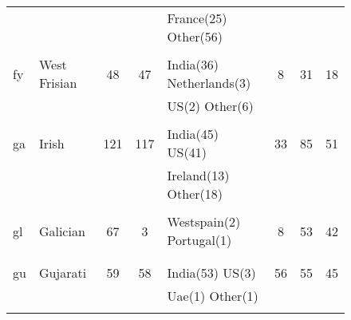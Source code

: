 \begin{figure}[h]
\begin{tabular}{llcclccc}
&&&&France(25) Other(56) &&&\\
&&&&&&&\\
fy&West Frisian&48&47&India(36) Netherlands(3) &8&31&18\\
&&&&US(2) Other(6) &&&\\
&&&&&&&\\
ga&Irish&121&117&India(45) US(41) &33&85&51\\
&&&&Ireland(13) Other(18) &&&\\
&&&&&&&\\
gl&Galician&67&3&Westspain(2) Portugal(1) &8&53&42\\
&&&&&&&\\
&&&&&&&\\
gu&Gujarati&59&58&India(53) US(3) &56&55&45\\
&&&&Uae(1) Other(1) &&&\\
&&&&&&&\\
\end{tabular}
\end{figure}
\clearpage
